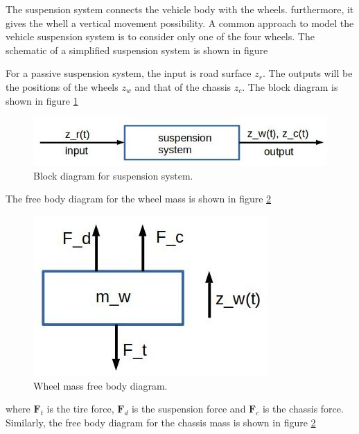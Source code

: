 The suspension system connects the vehicle body with the wheels. furthermore, it gives the whell a vertical movement possibility. A common approach to model the vehicle suspension
system is to consider only one of the four wheels. The schematic of a simplified suspension system is shown in figure

For a passive suspension system, the input is road surface $z_r$. The outputs will be the positions of the wheels $z_w$ and that of the chassis $z_c$. The block diagram is shown in figure
\ref{suspension_sys_block_diagram} 

\begin{figure}[!htb]
\begin{center}
\includegraphics[scale=0.280]{img/model_automotive_sys/suspension_sys_block_diagram.jpg}
\end{center}
\caption{Block diagram for suspension system.}
\label{suspension_sys_block_diagram}
\end{figure}

The free body diagram for the wheel mass is shown in figure \ref{suspension_sys_wheel_mass_free_diagram}


\begin{figure}[!htb]
\begin{center}
\includegraphics[scale=0.280]{img/model_automotive_sys/suspension_sys_wheel_mass_free_diagram.jpg}
\end{center}
\caption{Wheel mass free body diagram.}
\label{suspension_sys_wheel_mass_free_diagram}
\end{figure}

where $\mathbf{F}_t$ is the tire force, $\mathbf{F}_d$ is the suspension force and $\mathbf{F}_c$ is the chassis force. Similarly, the free body diagram for the chassis mass is shown in figure \ref{suspension_sys_wheel_mass_free_diagram}

